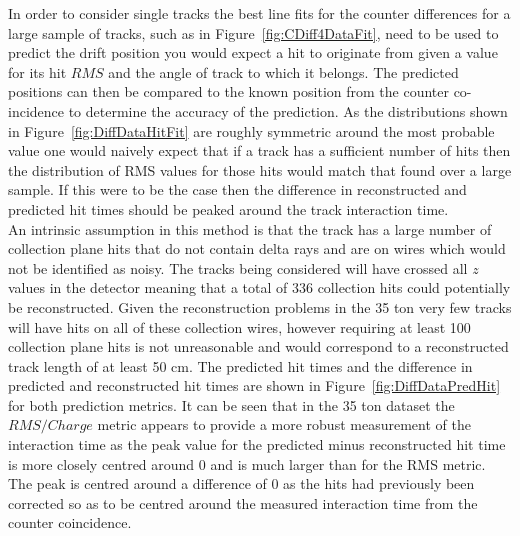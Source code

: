 In order to consider single tracks the best line fits for the counter differences for a large sample of tracks, such as in Figure~\ref{fig:CDiff4DataFit}, need to be used to predict the drift position you would expect a hit to originate from given a value for its hit $RMS$ and the angle of track to which it belongs. The predicted positions can then be compared to the known position from the counter co-incidence to determine the accuracy of the prediction. As the distributions shown in Figure~\ref{fig:DiffDataHitFit} are roughly symmetric around the most probable value one would naively expect that if a track has a sufficient number of hits then the distribution of RMS values for those hits would match that found over a large sample. If this were to be the case then the difference in reconstructed and predicted hit times should be peaked around the track interaction time. \\

An intrinsic assumption in this method is that the track has a large number of collection plane hits that do not contain delta rays and are on wires which would not be identified as noisy. The tracks being considered will have crossed all $z$ values in the detector meaning that a total of 336 collection hits could potentially be reconstructed. Given the reconstruction problems in the 35 ton very few tracks will have hits on all of these collection wires, however requiring at least 100 collection plane hits is not unreasonable and would correspond to a reconstructed track length of at least 50 cm. The predicted hit times and the difference in predicted and reconstructed hit times are shown in Figure~\ref{fig:DiffDataPredHit} for both prediction metrics. It can be seen that in the 35 ton dataset the $RMS/Charge$ metric appears to provide a more robust measurement of the interaction time as the peak value for the predicted minus reconstructed hit time is more closely centred around 0 and is much larger than for the RMS metric. The peak is centred around a difference of 0 as the hits had previously been corrected so as to be centred around the measured interaction time from the counter coincidence. \\

